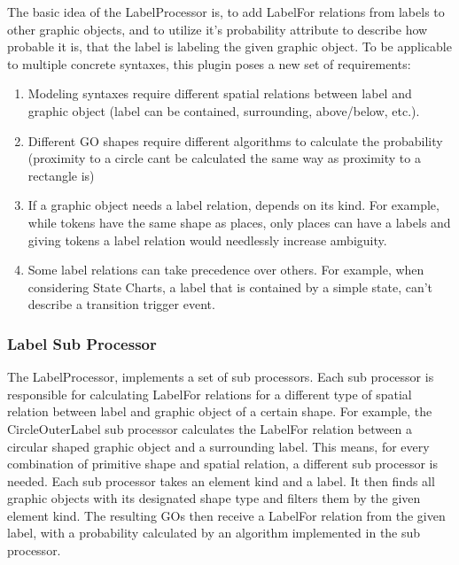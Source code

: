 The basic idea of the LabelProcessor is, to add LabelFor relations from labels to other graphic objects, and to utilize it's probability attribute to describe how probable it is, that the label is labeling the given graphic object. To be applicable to multiple concrete syntaxes, this plugin poses a new set of requirements: 
\begin{enumerate}
  \item Modeling syntaxes require different spatial relations between label and graphic object (label can be contained, surrounding, above/below, etc.).
  \item Different GO shapes require different algorithms to calculate the probability (proximity to a circle cant be calculated the same way as proximity to a rectangle is)
  \item If a graphic object needs a label relation, depends on its kind. For example, while tokens have the same shape as places, only places can have a labels and giving tokens a label relation would needlessly increase ambiguity.
  \item Some label relations can take precedence over others. For example, when considering State Charts, a label that is contained by a simple state, can't describe a transition trigger event.
\end{enumerate}

\subsubsection{Label Sub Processor}
The LabelProcessor, implements a set of sub processors. Each sub processor is responsible for calculating LabelFor relations for a different type of spatial relation between label and  graphic object of a certain shape. For example, the CircleOuterLabel sub processor calculates the LabelFor relation between a circular shaped graphic object and a surrounding label. This means, for every combination of primitive shape and spatial relation, a different sub processor is needed. Each sub processor takes an element kind and a label. It then finds all graphic objects with its designated shape type and filters them by the given element kind. The resulting GOs then receive a LabelFor relation from the given label, with a probability calculated by an algorithm implemented in the sub processor. 

